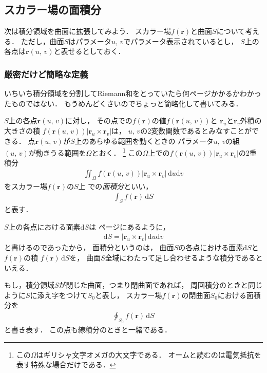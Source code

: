 \subsection{スカラー場の面積分}
次は積分領域を曲面に拡張してみよう．
スカラー場$f(\bm{r})$と曲面$S$について考える．
ただし，曲面$S$はパラメータ$u, \, v$でパラメータ表示されているとし，
$S$上の各点は$\bm{r}(u, \, v)$と表せるとしておく．

\subsubsection{厳密だけど簡略な定義}
いちいち積分領域を分割してRiemann和をとっていたら何ページかかるかわかったものではない．
もうめんどくさいのでちょっと簡略化して書いてみる．

$S$上の各点$\bm{r} (u, \, v)$に対し，
その点での$f(\bm{r})$の値$f(\bm{r}(u, \, v))$と
$\bm{r}_u$と$\bm{r}_v$外積の大きさの積
$f(\bm{r} (u, \, v) ) \lvert \bm{r}_u \times \bm{r}_v \rvert$は，
$u, \, v$の2変数関数であるとみなすことができる．
点$\bm{r}(u, \, v)$が$S$上のあらゆる範囲を動くときの
パラメータ$u, \, v$の組$(u, \, v)$が動きうる範囲を$\Omega$とおく．
\footnote{この$\Omega$はギリシャ文字オメガの大文字である．
オームと読むのは電気抵抗を表す特殊な場合だけである．}
この$\Omega$上での$f(\bm{r}(u, \, v)) \lvert \bm{r}_u \times \bm{r}_v \rvert $の2重積分
\begin{align*}
\iint_\Omega f ( \bm{r} (u, \, v) ) \lvert \bm{r}_u \times \bm{r}_v \rvert \, \mathrm{d}u \mathrm{d}v 
\end{align*}
をスカラー場$f(\bm{r} )$の$S$上
での\emph{面積分}といい，
\begin{align*}
\int_S f (\bm{r} ) \, \mathrm{d} S
\end{align*}
と表す．

$S$上の各点における面素$\mathrm{d} S$は
\pageref{eq:menso}ページにあるように，
\begin{align*}
\mathrm{d}S = \lvert \bm{r}_u \times \bm{r}_v \rvert \, \mathrm{d}u \mathrm{d}v
\end{align*}
と書けるのであったから，
面積分というのは，
曲面$S$の各点における面素$\mathrm{d}S$と$f(\bm{r})$の積
$f(\bm{r}) \, \mathrm{d} S$を，
曲面$S$全域にわたって足し合わせるような積分であるといえる．

もし，積分領域$S$が閉じた曲面，つまり閉曲面であれば，
周回積分のときと同じように$S$に添え字をつけて$S_0$と表し，
スカラー場$f(\bm{r})$の閉曲面$S_0$における面積分を
\begin{align*}
\oint_{S_0} f(\bm{r} ) \, \mathrm{d} S
\end{align*}
 と書き表す．
 この点も線積分のときと一緒である．

